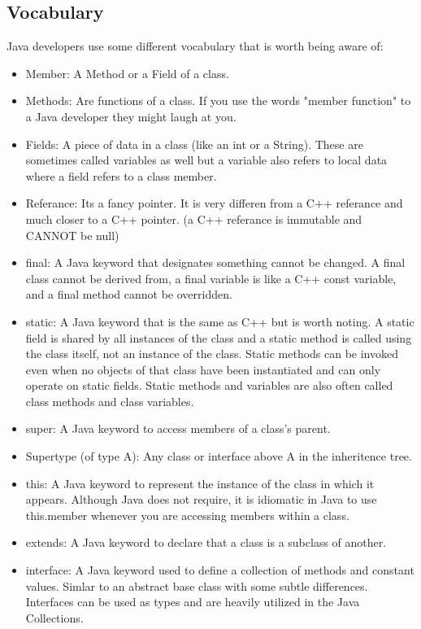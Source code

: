 \documentclass[../../main.tex]{subfiles}
\begin{document}
\subsection{Vocabulary}
Java developers use some different vocabulary that is worth being
aware of:
   \begin{itemize}
      \item Member: A Method or a Field of a class.
      \item Methods: Are functions of a class. If you use the words
         "member function" to a Java developer they might laugh at you.
      \item Fields: A piece of data in a class (like an int or a
         String). These are sometimes called variables as well but a
         variable also refers to local data where a field refers to a
         class member.
      \item Referance: Its a fancy pointer. It is very differen
         from a C++ referance and much closer to a C++ pointer.
         (a C++ referance is immutable and CANNOT be null)
      \item final: A Java keyword that designates something cannot be
         changed. A final class cannot be derived from, a final
         variable is like a C++ const variable, and a final method
         cannot be overridden.
      \item static: A Java keyword that is the same as C++ but is worth
         noting. A static field is shared by all instances of the class
         and a static method is called using the class itself, not an
         instance of the class. Static methods can be invoked even when
         no objects of that class have been instantiated and can only
         operate on static fields. Static methods and variables are
         also often called class methods and class variables.
      \item super: A Java keyword to access members of a class's
         parent.
      \item Supertype (of type A): Any class or interface above A in
         the inheritence tree.
      \item this: A Java keyword to represent the instance of the class
         in which it appears. Although Java does not require, it is
         idiomatic in Java to use this.member whenever you are
         accessing members within a class.
      \item extends: A Java keyword to declare that a class is a
         subclass of another.
      \item interface: A Java keyword used to define a collection of
         methods and constant values. Simlar to an abstract base class
         with some subtle differences. Interfaces can be used as types
         and are heavily utilized in the Java Collections.
   \end{itemize}
\end{document}
